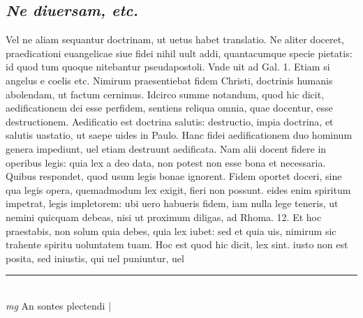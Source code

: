 \documentclass{article}
\begin{document}
\begin{pages}
\subsection*{\textit{Ne diuersam, etc. }}\pstart Vel ne aliam sequantur doctrinam, ut uetus habet translatio. Ne aliter doceret, praedicationi euangelicae siue fidei nihil uult addi, quantacumque  specie pietatis: id quod tum quoque  nitebantur pseudapostoli. Vnde uit ad Gal. 1. Etiam si angelus e coelis etc. Nimirum praesentiebat fidem Christi, doctrinis humanis abolendam, ut factum cernimus. Idcirco summe notandum, quod hic dicit, aedificationem dei esse perfidem, sentiens reliqua omnia, quae docentur, esse destructionem. Aedificatio est doctrina salutis: destructio, impia doctrina, et salutis uastatio, ut saepe uides in Paulo. Hanc fidei aedificationem duo hominum genera impediunt, uel etiam destruunt aedificata. Nam alii docent fidere in operibus legis: quia lex a deo data, non potest non esse bona et necessaria. Quibus respondet, quod usum legis bonae ignorent. Fidem oportet doceri, sine qua legis opera, quemadmodum lex exigit, fieri non possunt. eides enim spiritum impetrat, legis impletorem: ubi uero habueris fidem, iam nulla lege teneris, ut nemini quicquam debeas, nisi ut proximum diligas, ad Rhoma. 12. Et hoc praestabis, non solum quia debes, quia lex iubet: sed et quia uis, nimirum sic trahente spiritu uoluntatem tuam. Hoc est quod hic dicit, lex sint. iusto non est posita, sed iniustis, qui uel puniuntur, uel  \pend
\vspace{0.5cm}\noindent
\vspace{0.2cm}\rule{1cm}{0.2pt}\\ 
\hspace{0.2cm}\textit{mg}
\footnotesize An sontes plectendi 
\normalsize| 

\end{pages}
\end{document}
